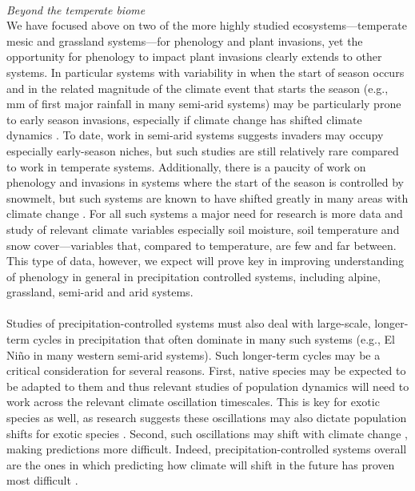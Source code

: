 \documentclass[11pt,a4paper,oneside]{article}
\begin{document}
\\
\noindent \emph{Beyond the temperate biome}\\
We have focused above on two of the more highly studied ecosystems---temperate mesic and grassland systems---for phenology and plant invasions, yet the opportunity for phenology to impact plant invasions clearly extends to other systems. In particular systems with variability in when the start of season occurs and in the related magnitude of the climate event that starts the season (e.g., mm of first major rainfall in many semi-arid systems) may be particularly prone to early season invasions, especially if climate change has shifted climate dynamics \citep[for a longer discussion see][]{wolkovich:2010fee}. To date, work in semi-arid systems suggests invaders may occupy especially early-season niches, but such studies are still relatively rare compared to work in temperate systems. Additionally, there is a paucity of work on phenology and invasions in systems where the start of the season is controlled by snowmelt, but such systems are known to have shifted greatly in many areas with climate change \citep{pederson2011}. For all such systems a major need for research is more data and study of relevant climate variables especially soil moisture, soil temperature and snow cover---variables that, compared to temperature, are few and far between. This type of data, however, we expect will prove key in improving understanding of phenology in general in precipitation controlled systems, including alpine, grassland, semi-arid and arid systems.  \\
\\
Studies of precipitation-controlled systems must also deal with large-scale, longer-term cycles in precipitation that often dominate in many such systems (e.g., El Ni\~{n}o in many western semi-arid systems). Such longer-term cycles may be a critical consideration for several reasons. First, native species may be expected to be adapted to them and thus relevant studies of population dynamics will need to work across the relevant climate oscillation timescales. This is key for exotic species as well, as research suggests these oscillations may also dictate population shifts for exotic species \citep{Salo:2005eo}. Second, such oscillations may shift with climate change \citep{ipccPhys2007}, making predictions more difficult. Indeed, precipitation-controlled systems overall are the ones in which predicting how climate will shift in the future has proven most difficult \citep{knutti2013}.\\
\end{document}
